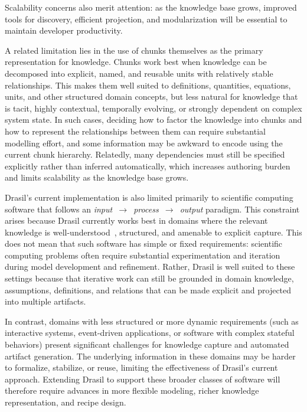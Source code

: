 Scalability concerns also merit attention: as the knowledge base grows,
improved tools for discovery, efficient projection, and modularization will
be essential to maintain developer productivity.

A related limitation lies in the use of chunks themselves as the primary 
representation for knowledge. Chunks work best when knowledge can be 
decomposed into explicit, named, and reusable units with relatively stable 
relationships. This makes them well suited to definitions, quantities, 
equations, units, and other structured domain concepts, but less natural for 
knowledge that is tacit, highly contextual, temporally evolving, or strongly 
dependent on complex system state. In such cases, deciding how to factor the 
knowledge into chunks and how to represent the relationships between them can 
require substantial modelling effort, and some information may be awkward to 
encode using the current chunk hierarchy. Relatedly, many dependencies must 
still be specified explicitly rather than inferred automatically, which 
increases authoring burden and limits scalability as the knowledge base grows.

Drasil's current implementation is also limited primarily to scientific 
computing software that follows an 
\mbox{\emph{input~$\rightarrow$~process~$\rightarrow$~output}} paradigm. This 
constraint arises because Drasil currently works 
best in domains where the relevant knowledge is 
well-understood~\citep{CaretteEtAl2023}, structured, and amenable to explicit 
capture. This does not mean that such software has simple or fixed 
requirements: scientific computing problems often require substantial 
experimentation and iteration during model development and refinement. Rather, 
Drasil is well suited to these settings because that iterative work can still 
be grounded in domain knowledge, assumptions, definitions, and relations that 
can be made explicit and projected into multiple artifacts. 

In contrast, domains with less structured or more dynamic 
requirements (such as interactive systems, event-driven 
applications, or software with complex stateful behaviors) present 
significant challenges for knowledge capture and automated artifact generation. 
The underlying information in these domains may be harder to formalize, 
stabilize, or reuse, limiting the effectiveness of Drasil's current approach. 
Extending Drasil to support these broader classes of software will therefore 
require advances in more flexible modeling, richer knowledge representation, 
and recipe design.

